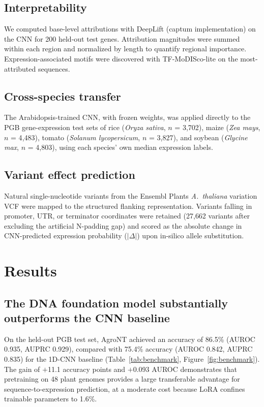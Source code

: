 \documentclass[11pt,a4paper]{article}
\begin{document}
\subsection{Interpretability}
We computed base-level attributions with DeepLift \cite{shrikumar2017} (captum implementation) on the CNN for 200 held-out test genes. Attribution magnitudes were summed within each region and normalized by length to quantify regional importance. Expression-associated motifs were discovered with TF-MoDISco-lite on the most-attributed sequences.

\subsection{Cross-species transfer}
The Arabidopsis-trained CNN, with frozen weights, was applied directly to the PGB gene-expression test sets of rice (\emph{Oryza sativa}, $n$ = 3{,}702), maize (\emph{Zea mays}, $n$ = 4{,}483), tomato (\emph{Solanum lycopersicum}, $n$ = 3{,}827), and soybean (\emph{Glycine max}, $n$ = 4{,}803), using each species' own median expression labels.

\subsection{Variant effect prediction}
Natural single-nucleotide variants from the Ensembl Plants \emph{A.\ thaliana} variation VCF were mapped to the structured flanking representation. Variants falling in promoter, UTR, or terminator coordinates were retained (27{,}662 variants after excluding the artificial N-padding gap) and scored as the absolute change in CNN-predicted expression probability ($|\Delta|$) upon in-silico allele substitution.

\section{Results}
\subsection{The DNA foundation model substantially outperforms the CNN baseline}
On the held-out PGB test set, AgroNT achieved an accuracy of 86.5\% (AUROC 0.935, AUPRC 0.929), compared with 75.4\% accuracy (AUROC 0.842, AUPRC 0.835) for the 1D-CNN baseline (Table~\ref{tab:benchmark}, Figure~\ref{fig:benchmark}). The gain of $+$11.1 accuracy points and $+$0.093 AUROC demonstrates that pretraining on 48 plant genomes provides a large transferable advantage for sequence-to-expression prediction, at a moderate cost because LoRA confines trainable parameters to 1.6\%.
\end{document}
